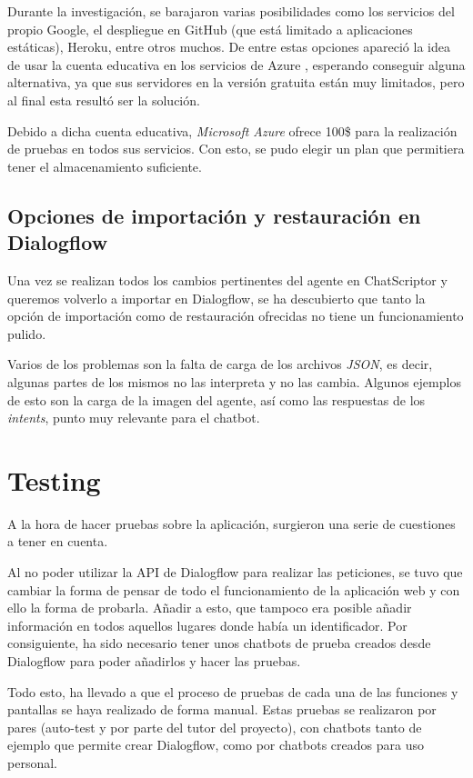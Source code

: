 Durante la investigación, se barajaron varias posibilidades como los servicios del propio Google, el despliegue en GitHub (que está limitado a aplicaciones estáticas), Heroku, entre otros muchos. De entre estas opciones apareció la idea de usar la cuenta educativa en los servicios de Azure \cite{Document56:online}, esperando conseguir alguna alternativa, ya que sus servidores en la versión gratuita están muy limitados, pero al final esta resultó ser la solución.

Debido a dicha cuenta educativa, \textit{Microsoft Azure} ofrece 100\$ para la realización de pruebas en todos sus servicios. Con esto, se pudo elegir un plan que permitiera tener el almacenamiento suficiente.

\subsection{Opciones de importación y restauración en Dialogflow}
Una vez se realizan todos los cambios pertinentes del agente en ChatScriptor y queremos volverlo a importar en Dialogflow, se ha descubierto que tanto la opción de importación como de restauración ofrecidas no tiene un funcionamiento pulido.

 Varios de los problemas son la falta de carga de los archivos \textit{JSON}, es decir, algunas partes de los mismos no las interpreta y no las cambia. Algunos ejemplos de esto son la carga de la imagen del agente, así como las respuestas de los \textit{intents}, punto muy relevante para el chatbot.


\section{Testing}
A la hora de hacer pruebas sobre la aplicación, surgieron una serie de cuestiones a tener en cuenta.

Al no poder utilizar la API de Dialogflow para realizar las peticiones, se tuvo que cambiar la forma de pensar de todo el funcionamiento de la aplicación web y con ello la forma de probarla. Añadir a esto, que tampoco era posible añadir información en todos aquellos lugares donde había un identificador. Por consiguiente, ha sido necesario tener unos chatbots de prueba creados desde Dialogflow para poder añadirlos y hacer las pruebas.

Todo esto, ha llevado a que el proceso de pruebas de cada una de las funciones y pantallas se haya realizado de forma manual. Estas pruebas se realizaron por pares (auto-test y por parte del tutor del proyecto), con chatbots tanto de ejemplo que permite crear Dialogflow, como por chatbots creados para uso personal.

